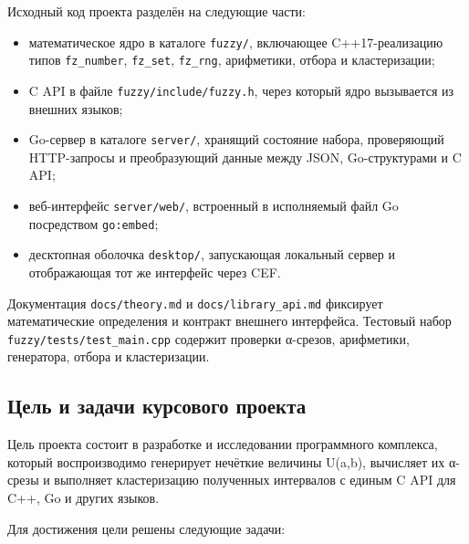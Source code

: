 Исходный код проекта разделён на следующие части:

\begin{itemize}
\item математическое ядро в каталоге \texttt{fuzzy/}, включающее C++17-реализацию типов \texttt{fz\_number}, \texttt{fz\_set}, \texttt{fz\_rng}, арифметики, отбора и кластеризации;
\end{itemize}

\begin{itemize}
\item C API в файле \texttt{fuzzy/include/fuzzy.h}, через который ядро вызывается из внешних языков;
\end{itemize}

\begin{itemize}
\item Go-сервер в каталоге \texttt{server/}, хранящий состояние набора, проверяющий HTTP-запросы и преобразующий данные между JSON, Go-структурами и C API;
\end{itemize}

\begin{itemize}
\item веб-интерфейс \texttt{server/web/}, встроенный в исполняемый файл Go посредством \texttt{go:embed};
\end{itemize}

\begin{itemize}
\item десктопная оболочка \texttt{desktop/}, запускающая локальный сервер и отображающая тот же интерфейс через CEF.
\end{itemize}

Документация \texttt{docs/theory.md} и \texttt{docs/library\_api.md} фиксирует математические определения и контракт внешнего интерфейса. Тестовый набор \texttt{fuzzy/tests/test\_main.cpp} содержит проверки α-срезов, арифметики, генератора, отбора и кластеризации.

\subsection{Цель и задачи курсового проекта}

Цель проекта состоит в разработке и исследовании программного комплекса, который воспроизводимо генерирует нечёткие величины U(a,b), вычисляет их α-срезы и выполняет кластеризацию полученных интервалов с единым C API для C++, Go и других языков.

Для достижения цели решены следующие задачи:

